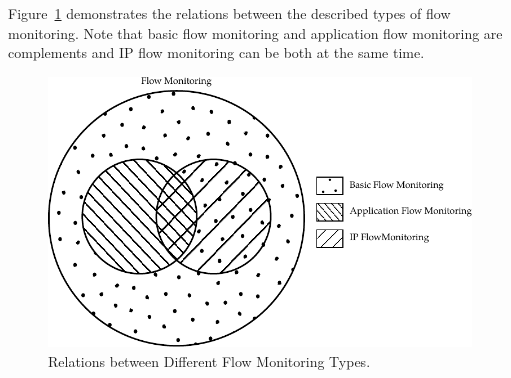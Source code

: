 Figure~\ref{fig:flow-monitoring-types} demonstrates the relations between the described types of flow monitoring. Note that basic flow monitoring and application flow monitoring are complements and IP flow monitoring can be both at the same time.

\begin{figure}[t!]
  \begin{center}
    \includegraphics{figures/c03/flow-monitoring-types}
  \end{center}
  \caption{Relations between Different Flow Monitoring Types.}
  \label{fig:flow-monitoring-types}
\end{figure}


